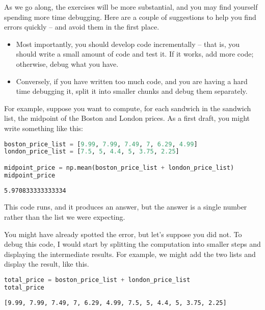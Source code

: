 As we go along, the exercises will be more substantial, and you may find
yourself spending more time debugging. Here are a couple of suggestions
to help you find errors quickly -- and avoid them in the first place.

\begin{itemize}
\item
  Most importantly, you should develop code incrementally -- that is,
  you should write a small amount of code and test it. If it works, add
  more code; otherwise, debug what you have.
\item
  Conversely, if you have written too much code, and you are having a
  hard time debugging it, split it into smaller chunks and debug them
  separately.
\end{itemize}

For example, suppose you want to compute, for each sandwich in the
sandwich list, the midpoint of the Boston and London prices. As a first
draft, you might write something like this:

\begin{lstlisting}[language=Python,style=source]
boston_price_list = [9.99, 7.99, 7.49, 7, 6.29, 4.99]
london_price_list = [7.5, 5, 4.4, 5, 3.75, 2.25]

midpoint_price = np.mean(boston_price_list + london_price_list)
midpoint_price
\end{lstlisting}

\begin{lstlisting}[style=output]
5.970833333333334
\end{lstlisting}

This code runs, and it produces an answer, but the answer is a single
number rather than the list we were expecting.

You might have already spotted the error, but let's suppose you did not.
To debug this code, I would start by splitting the computation into
smaller steps and displaying the intermediate results. For example, we
might add the two lists and display the result, like this.

\begin{lstlisting}[language=Python,style=source]
total_price = boston_price_list + london_price_list
total_price
\end{lstlisting}

\begin{lstlisting}[style=output]
[9.99, 7.99, 7.49, 7, 6.29, 4.99, 7.5, 5, 4.4, 5, 3.75, 2.25]
\end{lstlisting}

